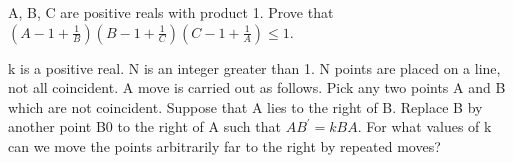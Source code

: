

\item A, B, C are positive reals with product 1. Prove that $(A - 1 +\frac{1}{B})(B - 1 + \frac{1}{C})(C - 1 + \frac{1}{A}) \leq 1$.\\

\item k is a positive real. N is an integer greater than 1. N points are placed on a line, not all coincident. A move is carried out as follows. Pick any two points A and B which are not coincident. Suppose that A lies to the right of B. Replace B by another point B0 to the right of A such that $AB^{'} = kBA$. For what values of k can we move the points arbitrarily far to the right by repeated moves?




